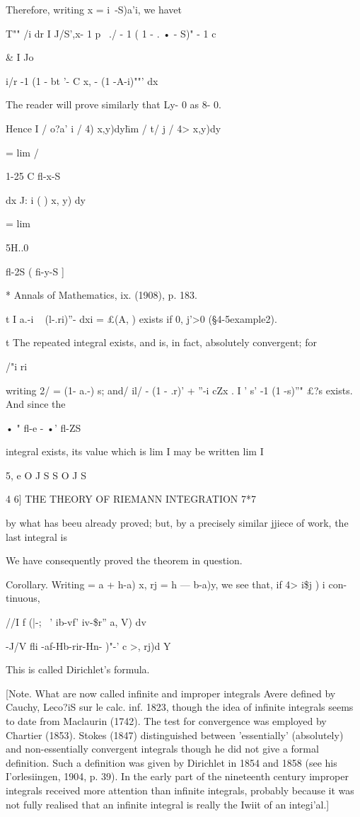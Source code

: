 Therefore, writing x = i\ -S)a'i, we havet

T"" /i dr I J/S',x- 1 p~ ./ - 1 ( 1 - . • - S)" - 1 c

  \& I Jo

 i/r -1 (1 - bt '- C x, - (1 -A-i)""' dx

The reader will prove similarly that Ly- 0 as 8- 0.

Hence I / o?a' i / 4) x,y)dy\= hm / t/ j / 4> x,y)dy\



= lim /



1-25 C fl-x-S

dx J: i ( ) x, y) dy



= lim

5H..0



fl-2S ( fi-y-S ]



* Annals of Mathematics, ix. (1908), p. 183.

t I a.-i ~ (l-.ri)''- dxi = £(A, ) exists if 0, j'>0 (§4-5example2).

t The repeated integral exists, and is, in fact, absolutely
convergent; for

/"i ri

writing 2/ = (1- a.-) s; and/ il/ - (1 - .r)' + ''-i cZx . I ' s' -1
(1 -s)''" £?s exists. And since the

• " fl-e - •' fl-ZS

integral exists, its value which is lim I may be written lim I

5, e O J S S O J S



4 6] THE THEORY OF RIEMANN INTEGRATION 7*7

by what has beeu already proved; but, by a precisely similar jjiece
of work, the last integral is

We have consequently proved the theorem in question.

Corollary. Writing = a + h-a) x, rj = h — b-a)y, we see that, if 4>
i\$j ) i con- tinuous,

//I f (|-; ~' ib-vf' iv-\$r'' a, V) dv

-J/V fli -af-Hb-rir-Hn- )"-' c >, rj)d Y

This is called Dirichlet's formula.

[Note. What are now called infinite and improper integrals Avere
defined by Cauchy, Leco?iS sur le calc. inf. 1823, though the idea of
infinite integrals seems to date from Maclaurin (1742). The test for
convergence was employed by Chartier (1853). Stokes (1847)
distinguished between 'essentially' (absolutely) and non-essentially
convergent integrals though he did not give a formal definition. Such
a definition was given by Dirichlet in 1854 and 1858 (see his
I'orlesiingen, 1904, p. 39). In the early part of the nineteenth
century improper integrals received more attention than infinite
integrals, probably because it was not fully realised that an infinite
integral is really the Iwiit of an integi'al.]

